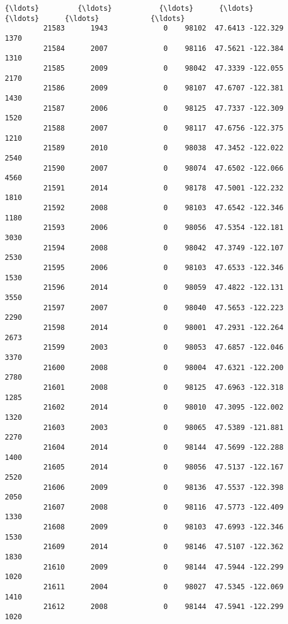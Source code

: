 \documentclass[11pt]{article}
\begin{document}
\begin{Verbatim}[commandchars=\\\{\}]
         {\ldots}         {\ldots}           {\ldots}      {\ldots}      {\ldots}      {\ldots}            {\ldots}   
         21583      1943             0    98102  47.6413 -122.329           1370   
         21584      2007             0    98116  47.5621 -122.384           1310   
         21585      2009             0    98042  47.3339 -122.055           2170   
         21586      2009             0    98107  47.6707 -122.381           1430   
         21587      2006             0    98125  47.7337 -122.309           1520   
         21588      2007             0    98117  47.6756 -122.375           1210   
         21589      2010             0    98038  47.3452 -122.022           2540   
         21590      2007             0    98074  47.6502 -122.066           4560   
         21591      2014             0    98178  47.5001 -122.232           1810   
         21592      2008             0    98103  47.6542 -122.346           1180   
         21593      2006             0    98056  47.5354 -122.181           3030   
         21594      2008             0    98042  47.3749 -122.107           2530   
         21595      2006             0    98103  47.6533 -122.346           1530   
         21596      2014             0    98059  47.4822 -122.131           3550   
         21597      2007             0    98040  47.5653 -122.223           2290   
         21598      2014             0    98001  47.2931 -122.264           2673   
         21599      2003             0    98053  47.6857 -122.046           3370   
         21600      2008             0    98004  47.6321 -122.200           2780   
         21601      2008             0    98125  47.6963 -122.318           1285   
         21602      2014             0    98010  47.3095 -122.002           1320   
         21603      2003             0    98065  47.5389 -121.881           2270   
         21604      2014             0    98144  47.5699 -122.288           1400   
         21605      2014             0    98056  47.5137 -122.167           2520   
         21606      2009             0    98136  47.5537 -122.398           2050   
         21607      2008             0    98116  47.5773 -122.409           1330   
         21608      2009             0    98103  47.6993 -122.346           1530   
         21609      2014             0    98146  47.5107 -122.362           1830   
         21610      2009             0    98144  47.5944 -122.299           1020   
         21611      2004             0    98027  47.5345 -122.069           1410   
         21612      2008             0    98144  47.5941 -122.299           1020   
         

\end{Verbatim}
\end{document}
